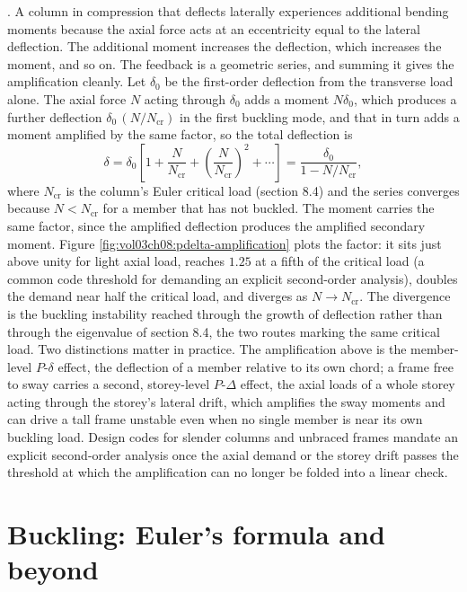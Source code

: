 . A column in compression that deflects
laterally experiences additional bending moments because the axial
force acts at an eccentricity equal to the lateral deflection. The
additional moment increases the deflection, which increases the
moment, and so on. The feedback is a geometric series, and summing it
gives the amplification cleanly. Let $\delta_0$ be the first-order
deflection from the transverse load alone. The axial force $N$ acting
through $\delta_0$ adds a moment $N\delta_0$, which produces a further
deflection $\delta_0\,(N/N_{\text{cr}})$ in the first buckling mode, and
that in turn adds a moment amplified by the same factor, so the total
deflection is
\[
\delta = \delta_0\left[1 + \frac{N}{N_{\text{cr}}}
+ \left(\frac{N}{N_{\text{cr}}}\right)^2 + \cdots\right]
= \frac{\delta_0}{1 - N/N_{\text{cr}}},
\]
where $N_{\text{cr}}$ is the column's Euler critical load (section 8.4)
and the series converges because $N < N_{\text{cr}}$ for a member that has
not buckled. The moment carries the same factor, since the amplified
deflection produces the amplified secondary moment. Figure
\ref{fig:vol03ch08:pdelta-amplification} plots the factor: it sits just
above unity for light axial load, reaches $1.25$ at a fifth of the
critical load (a common code threshold for demanding an explicit
second-order analysis), doubles the demand near half the critical load,
and diverges as $N \to N_{\text{cr}}$. The divergence is the buckling
instability reached through the growth of deflection rather than through
the eigenvalue of section 8.4, the two routes marking the same critical
load. Two distinctions matter in practice. The amplification above is the
member-level $P$-$\delta$ effect, the deflection of a member relative to
its own chord; a frame free to sway carries a second, storey-level
$P$-$\Delta$ effect, the axial loads of a whole storey acting through the
storey's lateral drift, which amplifies the sway moments and can drive a
tall frame unstable even when no single member is near its own buckling
load. Design codes for slender columns and unbraced frames mandate an
explicit second-order analysis once the axial demand or the storey drift
passes the threshold at which the amplification can no longer be folded
into a linear check.



\section{Buckling: Euler's formula and beyond}

